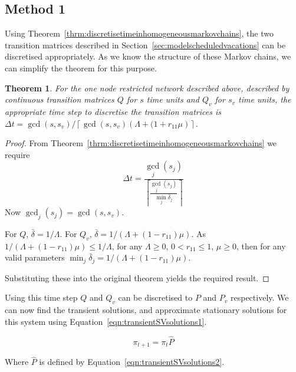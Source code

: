 \documentclass{article}
\newtheorem{theorem}{Theorem}
\begin{document}
\subsection{Method 1}\label{sec:method1}

Using Theorem~\ref{thrm:discretisetimeinhomogeneousmarkovchains}, the two transition matrices described in Section~\ref{sec:modelscheduledvacations} can be discretised appropriately.
As we know the structure of these Markov chains, we can simplify the theorem for this purpose.
\newline

\begin{theorem}\label{thrm:discretisescheduledvacations}
For the one node restricted network described above, described by continuous transition matrices $Q$ for $s$ time units and $Q_v$ for $s_v$ time units, the appropriate time step to discretise the transition matrices is $\Delta t = \gcd(s, s_v) / \left\lceil \gcd(s, s_v) \left(\Lambda + (1 + r_{11}\mu\right) \right\rceil$.
\end{theorem}

\begin{proof}
From Theorem~\ref{thrm:discretisetimeinhomogeneousmarkovchains} we require
\begin{equation*}
\Delta t = \frac{\gcd_j(s_j)}{\left\lceil \frac{\gcd_j(s_j)}{\min_j \bar{\delta}_j} \right\rceil}
\end{equation*}
Now $\gcd_j(s_j) = \gcd(s, s_v)$.

For $Q$, $\bar{\delta} = 1 / \Lambda$.
For $Q_v$, $\bar{\delta} = 1 /(\Lambda + (1 - r_{11})\mu)$.
As $1 /(\Lambda + (1 - r_{11})\mu) \leq 1 / \Lambda$, for any $\Lambda \geq 0$, $0 < r_{11} \leq 1$, $\mu \geq 0$, then for any valid parameters $\min_j \bar{\delta}_j = 1 /(\Lambda + (1 - r_{11})\mu)$.

Substituting these into the original theorem yields the required result.
\end{proof}

Using this time step $Q$ and $Q_v$ can be discretised to $P$ and $P_v$ respectively.
We can now find the transient solutions, and approximate stationary solutions for this system using Equation~\ref{eqn:transientSVsolutions1}.

\begin{equation}\label{eqn:transientSVsolutions1}
\pi_{t+1} = \pi_{t} \hat{P}
\end{equation}

Where $\hat{P}$ is defined by Equation~\ref{eqn:transientSVsolutions2}.
\end{document}
